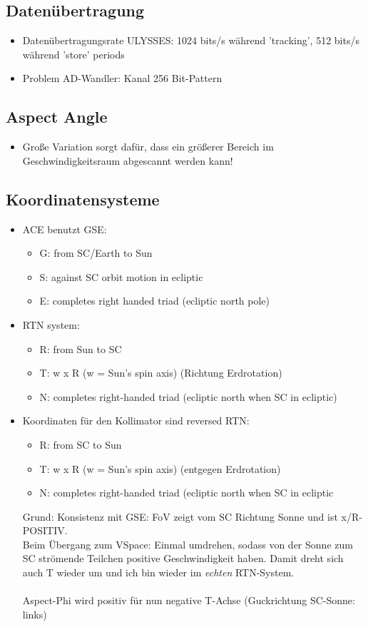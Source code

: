 \documentclass[]{article}
\begin{document}
	
	\subsection{Datenübertragung}
		\begin{itemize}
			\item Datenübertragungsrate ULYSSES: 1024 bits/s während 'tracking', 512 bits/s während 'store' periods
			\item Problem AD-Wandler: Kanal 256 Bit-Pattern 
		\end{itemize}
	\subsection{Aspect Angle}
	\begin{itemize}
		\item Große Variation sorgt dafür, dass ein größerer Bereich im Geschwindigkeitsraum abgescannt werden kann!
	\end{itemize}
	\subsection{Koordinatensysteme}
	\begin{itemize}
	\item ACE benutzt GSE: 
		\begin{itemize}
			\item G: from SC/Earth to Sun
			\item S: against SC orbit motion in ecliptic
			\item E: completes right handed triad (ecliptic north pole)
		\end{itemize}
	\item RTN system:
		\begin{itemize}
			\item R: from Sun to SC
			\item T: w x R (w = Sun's spin axis) (Richtung Erdrotation)
			\item N: completes right-handed triad (ecliptic north when SC in ecliptic)
		\end{itemize}
	\item Koordinaten für den Kollimator sind reversed RTN:
		\begin{itemize}
			\item R: from SC to Sun
			\item T: w x R (w = Sun's spin axis) (entgegen Erdrotation)
			\item N: completes right-handed triad (ecliptic north when SC in ecliptic
		\end{itemize}
	Grund: Konsistenz mit GSE: FoV zeigt vom SC Richtung Sonne und ist x/R-POSITIV.\\
	Beim Übergang zum VSpace: Einmal umdrehen, sodass von der Sonne zum SC strömende Teilchen positive Geschwindigkeit haben. Damit dreht sich auch T wieder um und ich bin wieder im \textit{echten} RTN-System. \\ \\
	Aspect-Phi wird positiv für nun negative T-Achse (Guckrichtung SC-Sonne: links)
	\end{itemize}
\end{document}
